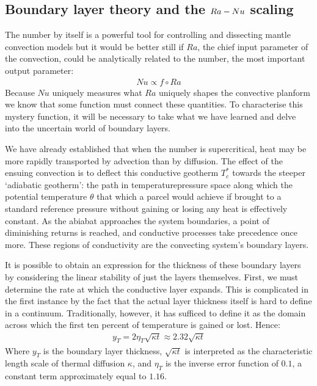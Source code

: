 \documentclass[letterpaper,10pt,english]{jupyterBook}
\begin{document}
\subsection{Boundary layer theory and the \protect\(Ra-Nu\protect\) scaling}
\label{\detokenize{content/chapter_02_methods/section1:boundary-layer-theory-and-the-ra-nu-scaling}}
\sphinxAtStartPar
The  number by itself is a powerful tool for controlling and dissecting mantle convection models \sphinxhyphen{} but it would be better still if \(Ra\), the chief input parameter of the convection, could be analytically related to the  number, the most important output parameter:
\begin{equation*}
\begin{split} Nu \propto f \circ Ra \end{split}
\end{equation*}
\sphinxAtStartPar
Because \(Nu\) uniquely measures what \(Ra\) uniquely shapes \sphinxhyphen{} the convective planform \sphinxhyphen{} we know that some function must connect these quantities. To characterise this mystery function, it will be necessary to take what we have learned and delve into the uncertain world of boundary layers.

\sphinxAtStartPar
We have already established that when the  number is supercritical, heat may be more rapidly transported by advection than by diffusion. The effect of the ensuing convection is to deflect this conductive geotherm \(T_c^*\) towards the steeper ‘adiabatic geotherm’: the path in temperature\sphinxhyphen{}pressure space along which the potential temperature \(\theta\) \sphinxhyphen{} that which a parcel would achieve if brought to a standard reference pressure without gaining or losing any heat \sphinxhyphen{} is effectively constant. As the abiabat approaches the system boundaries, a point of diminishing returns is reached, and conductive processes take precedence once more. These regions of conductivity are the convecting system’s boundary layers.

\sphinxAtStartPar
It is possible to obtain an expression for the thickness of these boundary layers by considering the linear stability of just the layers themselves. First, we must determine the rate at which the conductive layer expands. This is complicated in the first instance by the fact that the actual layer thickness itself is hard to define in a continuum. Traditionally, however, it has sufficed to define it as the domain across which the first ten percent of temperature is gained or lost. Hence:
\begin{equation*}
\begin{split} y_T = 2 \eta_T \sqrt{\kappa t} \approx 2.32 \sqrt{\kappa t} \end{split}
\end{equation*}
\sphinxAtStartPar
Where \(y_T\) is the boundary layer thickness, \(\sqrt{\kappa t}\) is interpreted as the characteristic length scale of thermal diffusion \(\kappa\), and \(\eta_T\) is the inverse error function of \(0.1\), a constant term approximately equal to \(1.16\).
\end{document}
